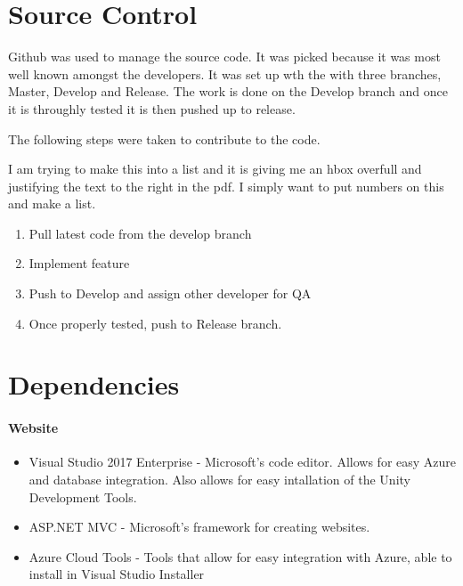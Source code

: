 \section{Source  Control}
Github was used to manage the source code. It was picked because it was most well known amongst the
developers. It was set up wth the with three branches, Master, Develop and Release. The work is done on the Develop branch
and once it is throughly tested it is then pushed up to release.

The following steps were taken to contribute to the code.
	
I am trying to make this into a list and it is giving me an hbox overfull and justifying the text to the right in the pdf. I simply want to put numbers on this and make a list.

\begin{enumerate}

\item Pull latest code from the develop branch
\item Implement feature
\item Push to Develop and assign other developer for QA
\item Once properly tested, push to Release branch.

\end{enumerate}

\section{Dependencies}
\paragraph{Website}
\begin{itemize}
    \item Visual Studio 2017 Enterprise - Microsoft's code editor. Allows for easy Azure and database
    integration. Also allows for easy intallation of the Unity Development Tools.
    \item ASP.NET MVC - Microsoft's framework for creating websites.
    \item Azure Cloud Tools - Tools that allow for easy integration with Azure, able to install in Visual Studio Installer
\end{itemize}

